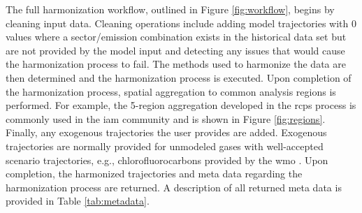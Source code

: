 \documentclass[review]{elsarticle}
\newcommand{\code}[1]{\lstinline[basicstyle=\ttfamily\color{black}]|#1|}
\begin{document}

The full harmonization workflow, outlined in Figure \ref{fig:workflow}, begins
by cleaning input data. Cleaning operations include adding model
trajectories with 0 values where a sector/emission combination exists in the historical data set but are not provided by the
model input and detecting any issues that would cause the harmonization process
to fail. The methods used to harmonize the data are then determined and the
harmonization process is executed. Upon completion of the harmonization process,
spatial aggregation to common analysis regions is performed. For example, the
5-region aggregation developed in the \glspl{rcp}
\cite{vuuren_representative_2011} process is commonly used in the \gls{iam}
community and is shown in Figure \ref{fig:regions}. Finally, any exogenous
trajectories the user provides are added. Exogenous trajectories are normally
provided for unmodeled gases with well-accepted scenario trajectories, e.g.,
chlorofluorocarbons provided by the \gls{wmo} \cite{wmo2014}. Upon completion,
the harmonized trajectories and meta data regarding the harmonization process
are returned. A description of all returned meta data is provided in Table
\ref{tab:metadata}.
\end{document}
